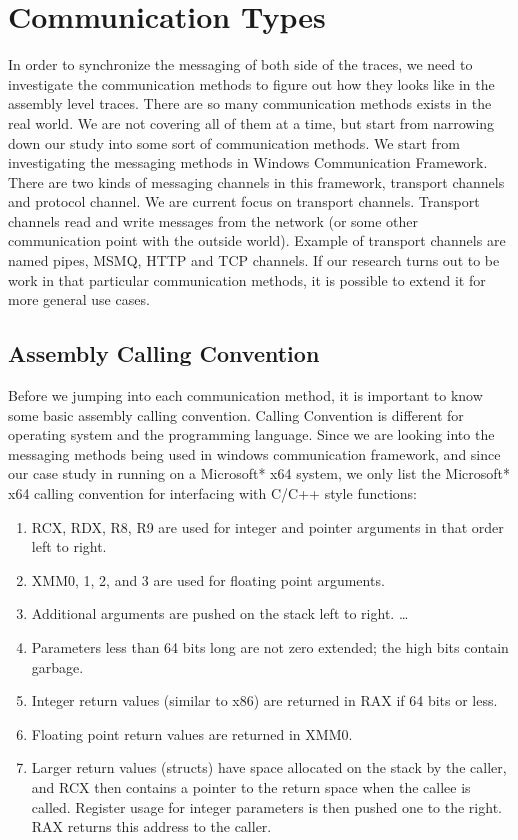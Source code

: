 \documentclass[paper=a4, fontsize=11pt]{scrartcl}
\numberwithin{equation}{section}		%
\numberwithin{figure}{section}			%
\numberwithin{table}{section}				%
\begin{document}
\section{Communication Types}
In order to synchronize the messaging of both side of the traces, we need to investigate the communication methods to figure out how they looks like in the assembly level traces.
There are so many communication methods exists in the real world. We are not covering all of them at a time, but start from narrowing down our study into some sort of communication methods. We start from investigating the messaging methods in Windows Communication Framework. There are two kinds of messaging channels in this framework, transport channels and protocol channel. We are current focus on transport channels. Transport channels read and write messages from the network (or some other communication point with the outside world). Example of transport channels are named pipes, MSMQ, HTTP and TCP channels. If our research turns out to be work in that particular communication methods, it is possible to extend it for more general use cases.
\subsection{Assembly Calling Convention}
Before we jumping into each communication method, it is important to know some basic assembly calling convention.
Calling Convention is different for operating system and the programming language. Since we are looking into the messaging methods being used in windows communication framework, and since our case study in running on a Microsoft* x64 system, we only list the Microsoft* x64 calling convention for interfacing with C/C++ style functions:\par
\begin{enumerate}  
\item RCX, RDX, R8, R9 are used for integer and pointer arguments in that order left to right.
\item XMM0, 1, 2, and 3 are used for floating point arguments.
\item Additional arguments are pushed on the stack left to right. \ldots 
\item Parameters less than 64 bits long are not zero extended; the high bits contain garbage.
\item Integer return values (similar to x86) are returned in RAX if 64 bits or less.
\item Floating point return values are returned in XMM0.
\item Larger return values (structs) have space allocated on the stack by the caller, and RCX then contains a pointer to the return space when the callee is called. Register usage for integer parameters is then pushed one to the right. RAX returns this address to the caller.
\end{enumerate}
\end{document}
